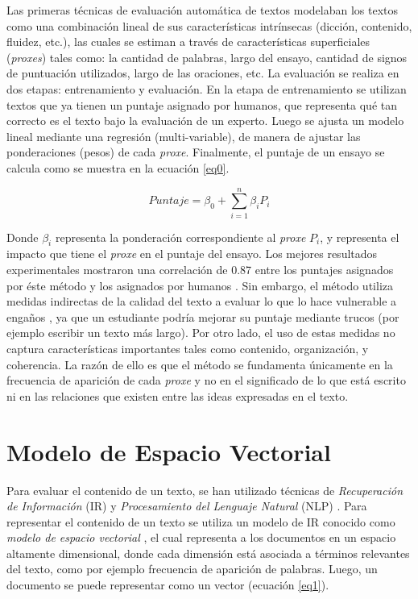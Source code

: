 \documentclass[12pt]{diicc}
\begin{document}
Las primeras técnicas de evaluación automática de textos \cite{t0} modelaban los textos como una combinación lineal de sus características intrínsecas (dicción, contenido, fluidez, etc.), las cuales se estiman a través de características superficiales ({\em proxes}) tales como: la cantidad de palabras, largo del ensayo, cantidad de signos de puntuación utilizados, largo de las oraciones, etc. La evaluación se realiza en dos etapas: entrenamiento y evaluación. En la etapa de entrenamiento se utilizan textos que ya tienen un puntaje asignado por humanos, que representa qué tan correcto es el texto bajo la evaluación de un experto. Luego se ajusta un modelo lineal mediante una regresión (multi-variable), de manera de ajustar las ponderaciones (pesos) de cada {\em proxe}. Finalmente, el puntaje de un ensayo se calcula como se muestra en la ecuación \ref{eq0}.

\begin{equation}
	\label{eq0}
	Puntaje = \beta_0 + \sum\limits_{i=1}^n \beta_iP_i
\end{equation}

Donde $\beta_i$ representa la ponderación correspondiente al {\em proxe} $P_i$, y representa el impacto que tiene el {\em proxe} en el puntaje del ensayo. Los mejores resultados experimentales mostraron una correlación de 0.87 entre los puntajes asignados por éste método y los asignados por humanos \cite{t0}. Sin embargo, el método utiliza medidas indirectas de la calidad del texto a evaluar lo que lo hace vulnerable a engaños \cite{t9}, ya que un estudiante podría mejorar su puntaje mediante trucos (por ejemplo escribir un texto más largo). Por otro lado, el uso de estas medidas no captura características importantes tales como contenido, organización, y coherencia. La razón de ello es que el método se fundamenta únicamente en la frecuencia de aparición de cada {\em proxe} y no en el significado de lo que está escrito ni en las relaciones que existen entre las ideas expresadas en el texto.

\section{Modelo de Espacio Vectorial}

Para evaluar el contenido de un texto, se han utilizado técnicas de {\em Recuperación de Información} (IR) \cite{t26} y {\em Procesamiento del Lenguaje Natural} (NLP) \cite{t27}. Para representar el contenido de un texto se utiliza un modelo de IR conocido como {\em modelo de espacio vectorial} \cite{t26}, el cual representa a los documentos en un espacio altamente dimensional, donde cada dimensión está asociada a términos relevantes del texto, como por ejemplo frecuencia de aparición de palabras. Luego, un documento se puede representar como un vector (ecuación \ref{eq1}).
\end{document}
